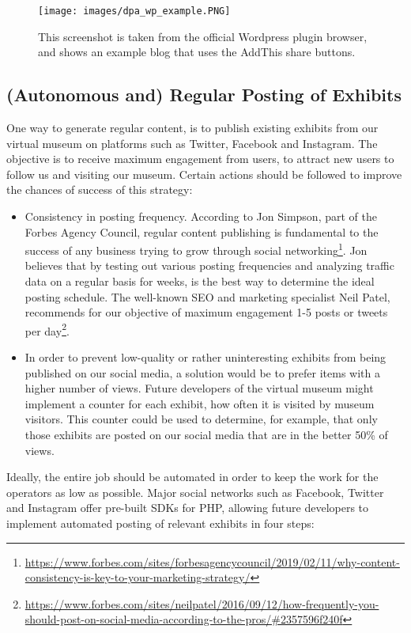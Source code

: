 \begin{figure}[h]
\centering
\texttt{[image: images/dpa\_wp\_example.PNG]}
\caption{This screenshot is taken from the official Wordpress plugin browser, and shows an example blog that uses the AddThis share buttons.}
\label{fig::cl_homepage}
\end{figure}

\subsection{(Autonomous and) Regular Posting of Exhibits} \label{socail_regular}

One way to generate regular content, is to publish existing exhibits from our virtual museum on platforms such as Twitter, Facebook and Instagram. The objective is to receive maximum engagement from users, to attract new users to follow us and visiting our museum. Certain actions should be followed to improve the chances of success of this strategy:

\begin{itemize}
    \item Consistency in posting frequency. According to Jon Simpson, part of the Forbes Agency Council, regular content publishing is fundamental to the success of any business trying to grow through social networking\footnote{\url{https://www.forbes.com/sites/forbesagencycouncil/2019/02/11/why-content-consistency-is-key-to-your-marketing-strategy/}}. Jon believes that by testing out various posting frequencies and analyzing traffic data on a regular basis for weeks, is the best way to determine the ideal posting schedule. The well-known SEO and marketing specialist Neil Patel, recommends for our objective of maximum engagement 1-5 posts or tweets per day\footnote{\url{https://www.forbes.com/sites/neilpatel/2016/09/12/how-frequently-you-should-post-on-social-media-according-to-the-pros/#2357596f240f}}.
    \item In order to prevent low-quality or rather uninteresting exhibits from being published on our social media, a solution would be to prefer  items with a higher number of views. Future developers of the virtual museum might implement a counter for each exhibit, how often it is visited by museum visitors. This counter could be used to determine, for example, that only those exhibits are posted on our social media that are in the better 50\% of views.
\end{itemize}

\noindent Ideally, the entire job should be automated in order to keep the work for the operators as low as possible. Major social networks such as Facebook, Twitter and Instagram offer pre-built SDKs for PHP, allowing future developers to implement automated posting of relevant exhibits in four steps:

